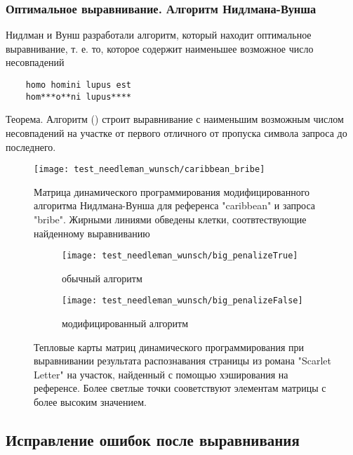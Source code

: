 \documentclass{main.tex}[subfiles]
\begin{document}
\subsubsection{Оптимальное выравнивание. Алгоритм Нидлмана-Вунша}

Нидлман и Вунш \cite{needleman1970} разработали алгоритм, который находит оптимальное выравнивание, т. е. то, которое содержит наименьшее возможное число несовпадений

\begin{verbatim}
    homo homini lupus est
    hom***o**ni lupus****
\end{verbatim}

Теорема. Алгоритм () %
строит выравнивание с наименьшим возможным числом несовпадений на участке от первого отличного от пропуска символа запроса до последнего.


\begin{figure}[H]
    \centering
    \texttt{[image: test\_needleman\_wunsch/caribbean\_bribe]}
    \caption{Матрица динамического программирования модифицированного алгоритма Нидлмана-Вунша для референса "caribbean"\hspace{0pt} и запроса "bribe". Жирными линиями обведены клетки, соотвтествующие найденному выравниванию }
    \label{fig:caribbean_bribe} %
\end{figure}

\begin{figure}[H]
    \centering
    \begin{subfigure}{.5\textwidth}
        \centering
        \texttt{[image: test\_needleman\_wunsch/big\_penalizeTrue]}
        \caption{обычный алгоритм}
    \end{subfigure}%
    \begin{subfigure}{.5\textwidth}
        \centering
        \texttt{[image: test\_needleman\_wunsch/big\_penalizeFalse]}
        \caption{модифицированный алгоритм}
    \end{subfigure}
    \caption{Тепловые карты матриц динамического программирования при выравнивании результата распознавания страницы из романа "Scarlet Letter"\hspace{0pt} на участок, найденный с помощью хэширования на референсе.
    Более светлые точки сооветствуют элементам матрицы с более высоким значением.}
    \label{fig:needleman_real} %
\end{figure}

\subsection{Исправление ошибок после выравнивания}
\end{document}
